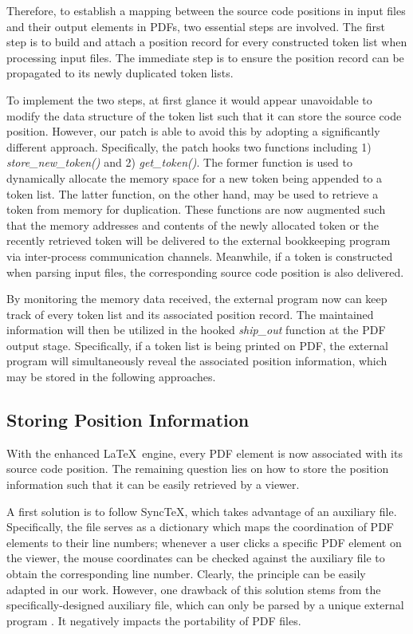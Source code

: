 \documentclass[sigconf]{acmart}
\begin{document}
Therefore, to establish a mapping between the source code positions in input files and their output elements in PDFs, two essential steps are involved. 
The first step is to build and attach a position record for every constructed token list when processing input files. 
The immediate step is to ensure the position record can be propagated to its newly duplicated token lists. 

To implement the two steps, at first glance it would appear unavoidable to modify the data structure of the token list such that it can store the source code position. 
However, our patch is able to avoid this by  adopting a significantly different approach. 
Specifically, the patch hooks two functions including 1) \textit{store\_new\_token()} and 2) \textit{get\_token()}. 
The former function  is used to dynamically allocate the memory space for a new token being appended to a token list. 
The latter function, on the other hand, may be used to retrieve a token from memory for duplication. 
These functions are now augmented such that the memory addresses and contents of the newly allocated token or the recently retrieved token will be delivered to the external bookkeeping program via inter-process communication channels. 
Meanwhile, if a token is constructed when parsing input files, the corresponding source code position is also delivered. 

By monitoring the memory data received, the external program now can keep track of every token list and its associated position record. 
The maintained information will then be utilized in the hooked \textit{ship\_out} function at the PDF output stage.
Specifically, if a token list is being printed on PDF, the external program will simultaneously reveal the associated position information, which may be stored in the following approaches.

\subsection{Storing Position Information}
With the enhanced \LaTeX\ engine, every PDF element is now associated with its source code position. The remaining question lies on how to store the position information such that it can be easily retrieved by a viewer.

A first solution is to follow Sync\TeX , which takes advantage of an auxiliary file. 
Specifically, the file serves as a dictionary which maps the coordination of PDF elements to their line numbers; whenever a user clicks a specific PDF element on the viewer, the mouse coordinates can be checked against the auxiliary file to obtain the corresponding line number. 
Clearly, the principle can be easily adapted in our work. 
However, one drawback of this solution stems from the specifically-designed auxiliary file, which can only be parsed by a unique external program \cite{libsynctex2011}. It negatively impacts the portability of PDF files.
\end{document}
